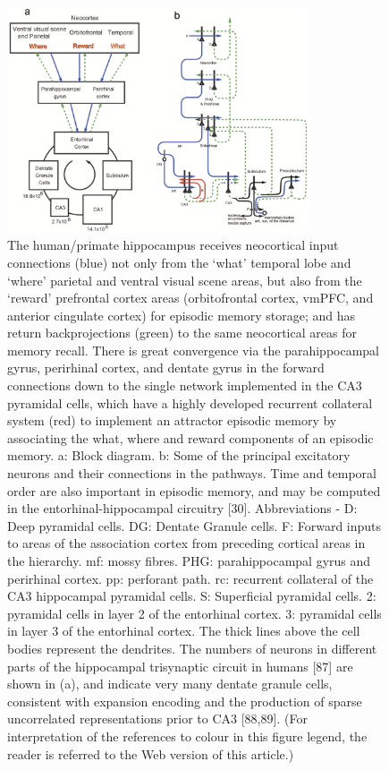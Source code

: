 \documentclass[openany]{book}
\begin{document}
\begin{appendices}
\begin{figure}[htb!]
  \centering
  \includegraphics[width=0.8\textwidth]{image/appendix_d}
  \caption{The human/primate hippocampus receives neocortical input connections (blue) not only from the ‘what’ temporal lobe and ‘where’ parietal
    and ventral visual scene areas, but also from the ‘reward’ prefrontal cortex areas (orbitofrontal cortex, vmPFC, and anterior cingulate cortex) for
    episodic memory storage; and has return backprojections (green) to the same neocortical areas for memory recall. There is great convergence via the
    parahippocampal gyrus, perirhinal cortex, and dentate gyrus in the forward connections down to the single network implemented in the CA3
    pyramidal cells, which have a highly developed recurrent collateral system (red) to implement an attractor episodic memory by associating the
    what, where and reward components of an episodic memory. a: Block diagram. b: Some of the principal excitatory neurons and their connections in
    the pathways. Time and temporal order are also important in episodic memory, and may be computed in the entorhinal-hippocampal circuitry [30].
    Abbreviations - D: Deep pyramidal cells. DG: Dentate Granule cells. F: Forward inputs to areas of the association cortex from preceding cortical areas
    in the hierarchy. mf: mossy fibres. PHG: parahippocampal gyrus and perirhinal cortex. pp: perforant path. rc: recurrent collateral of the CA3
    hippocampal pyramidal cells. S: Superficial pyramidal cells. 2: pyramidal cells in layer 2 of the entorhinal cortex. 3: pyramidal cells in layer 3 of the
    entorhinal cortex. The thick lines above the cell bodies represent the dendrites. The numbers of neurons in different parts of the hippocampal
    trisynaptic circuit in humans [87] are shown in (a), and indicate very many dentate granule cells, consistent with expansion encoding and the
    production of sparse uncorrelated representations prior to CA3 [88,89]. (For interpretation of the references to colour in this figure legend, the
    reader is referred to the Web version of this article.)}
\end{figure}


\end{appendices}
\end{document}
